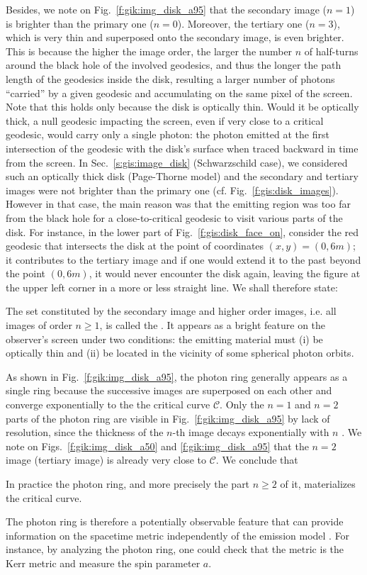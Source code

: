 Besides, we note on Fig.~\ref{f:gik:img_disk_a95}
that the secondary image ($n=1$) is brighter than the primary one ($n=0$). Moreover,
the tertiary one ($n=3$), which is very thin and superposed onto the secondary image,
is even brighter. This is because the higher the image order, the larger the
number $n$ of half-turns around the black hole of the involved geodesics,
and thus the longer the path length of the geodesics inside the disk, resulting
a larger number of photons ``carried'' by a given geodesic and accumulating on
the same pixel of the screen. Note that this holds only
because the disk is optically thin. Would it be optically thick, a null geodesic
impacting the screen, even if very close to a critical geodesic, would carry only a single photon: the photon emitted at the
first intersection of the geodesic with the disk's surface when traced backward in time from the screen.
In Sec.~\ref{s:gis:image_disk} (Schwarzschild case), we considered such an optically thick
disk (Page-Thorne model) and the secondary and tertiary images were not brighter than
the primary one (cf. Fig.~\ref{f:gis:disk_images}). However in that case, the main
reason was that the emitting region was too far from the black hole for a close-to-critical
geodesic to visit various parts of the disk. For instance, in the lower part of Fig.~\ref{f:gis:disk_face_on}, consider the red geodesic that intersects the disk
at the point of coordinates $(x,y) = (0, 6m)$; it contributes to
the tertiary image and if one would extend it to the past beyond the point $(0, 6m)$, it
would never encounter the disk again, leaving the figure at the upper left corner
in a more or less straight line. We shall therefore state:
\begin{greybox}
The set constituted by the secondary image and higher order images, i.e. all images
of order $n\geq 1$, is called
the .
It appears as a bright feature on the observer's screen under two conditions:
the emitting material must (i) be optically
thin and (ii) be located in the vicinity of some spherical photon orbits.
\end{greybox}
As shown
in Fig.~\ref{f:gik:img_disk_a95}, the photon ring generally appears as a single ring because
the successive images are superposed on each other and converge exponentially
to the the critical curve $\mathscr{C}$. Only the $n=1$ and $n=2$ parts of the photon ring
are visible in Fig.~\ref{f:gik:img_disk_a95} by lack of resolution, since
the thickness of the $n$-th image decays exponentially with $n$ \cite{GrallL20a}.
We note on Figs.~\ref{f:gik:img_disk_a50} and \ref{f:gik:img_disk_a95}
that the $n=2$ image (tertiary image) is already very close to $\mathscr{C}$.
We conclude that
\begin{greybox}
In practice the photon ring, and more precisely the part $n\geq 2$ of it,
materializes the critical curve.
\end{greybox}
The photon ring is therefore
a potentially observable feature that can provide information on the
spacetime metric independently of the emission model \cite{Johns_al20}.
For instance, by analyzing the photon ring, one could check that the metric is the Kerr metric and measure the spin parameter $a$.

